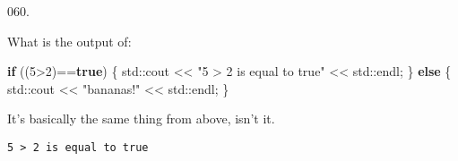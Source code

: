 \documentclass[]{book}
\newenvironment{Shaded}{}{}
\newcommand{\BuiltInTok}[1]{#1}
\newcommand{\ControlFlowTok}[1]{\textcolor[rgb]{0.00,0.44,0.13}{\textbf{#1}}}
\newcommand{\DecValTok}[1]{\textcolor[rgb]{0.25,0.63,0.44}{#1}}
\newcommand{\KeywordTok}[1]{\textcolor[rgb]{0.00,0.44,0.13}{\textbf{#1}}}
\newcommand{\NormalTok}[1]{#1}
\newcommand{\StringTok}[1]{\textcolor[rgb]{0.25,0.44,0.63}{#1}}
\begin{document}
\begin{minipage}{\linewidth}\noindent
{\tiny 060.}\\
\begin{minipage}[t]{.485\linewidth}

What is the output of:

\begin{framed}

\begin{Shaded}
\begin{Highlighting}[]
\ControlFlowTok{if}\NormalTok{ ((}\DecValTok{5}\NormalTok{>}\DecValTok{2}\NormalTok{)==}\KeywordTok{true}\NormalTok{) \{}
  \BuiltInTok{std::}\NormalTok{cout << }\StringTok{"5 > 2 is equal to true"}
\NormalTok{            << }\BuiltInTok{std::}\NormalTok{endl;}
\NormalTok{\} }\ControlFlowTok{else}\NormalTok{ \{}
  \BuiltInTok{std::}\NormalTok{cout << }\StringTok{"bananas!"}\NormalTok{ << }\BuiltInTok{std::}\NormalTok{endl;}
\NormalTok{\}}
\end{Highlighting}
\end{Shaded}

\end{framed}

\end{minipage}
\hfill
\begin{minipage}[t]{.485\linewidth}

It's basically the same thing from above, isn't it.

\begin{framed}

\begin{verbatim}
5 > 2 is equal to true
\end{verbatim}

\end{framed}

\end{minipage}
\end{minipage}

\vspace{2mm}\noindent\hrulefill{}
\end{document}
